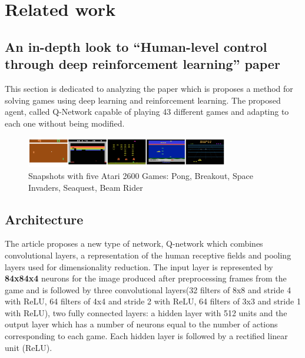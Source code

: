 \chapter{Related work}
\label{chapter:related}

\section{An in-depth look to ``Human-level control through deep reinforcement learning'' paper}
This section is dedicated to analyzing the paper which is proposes a method for solving games using deep learning and reinforcement learning. The proposed agent, called Q-Network capable of playing 43 different games and adapting to each one without being modified.


\begin{figure}[h]
	\begin{center}
		\includegraphics[width=334px,height=51px]{src/img/state/ataripic}
		\caption{Snapshots with five Atari 2600 Games: Pong, Breakout, Space Invaders, Seaquest, Beam Rider\cite{nature}} \label{fig:ataripic}
    \end{center}
\end{figure}




\section{Architecture}
The article\cite{nature} proposes a new type of network, Q-network which combines convolutional layers, a representation of the human receptive fields and pooling layers used for dimensionality reduction. The input layer is represented by \textbf{84x84x4} neurons for the image produced after preprocessing frames from the game and is followed by three convolutional layers(32 filters of 8x8 and stride 4 with ReLU, 64 filters of 4x4 and stride 2 with ReLU, 64 filters of 3x3 and stride 1 with ReLU), two fully connected layers: a hidden layer with 512 units and the output layer which has a number of neurons equal to the number of actions corresponding to each game. Each hidden layer is followed by a rectified linear unit (ReLU).



